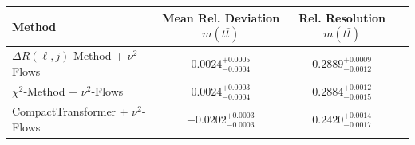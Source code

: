     \begin{tabular}{lccc}
        \toprule
        Method & Mean Rel. Deviation $m(t\bar{t})$ & Rel. Resolution $m(t\bar{t})$ \\
        \midrule
        $\Delta R(\ell,j)$-Method + $\nu^2$-Flows & $0.0024^{+0.0005}_{-0.0004}$ & $0.2889^{+0.0009}_{-0.0012}$ \\
        $\chi^2$-Method + $\nu^2$-Flows & $0.0024^{+0.0003}_{-0.0004}$ & $0.2884^{+0.0012}_{-0.0015}$ \\
        CompactTransformer + $\nu^2$-Flows & $-0.0202^{+0.0003}_{-0.0003}$ & $0.2420^{+0.0014}_{-0.0017}$ \\
        \bottomrule
    \end{tabular}